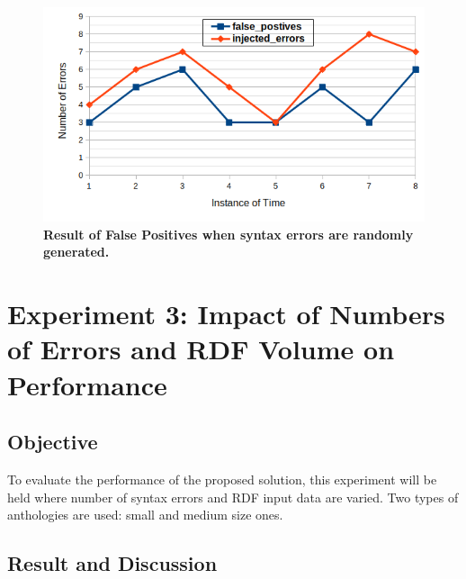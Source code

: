 	\begin{figure}[ht]
	\begin{center}
		\includegraphics[scale=0.8,angle=0]{images/Experiment02-03.png}
				\setlength\belowcaptionskip{-5mm}
		\caption{\textbf{Result of False Positives when syntax errors are randomly generated.}} 
		\label{Fig:Experiment02-03}
	\end{center}
\end{figure}

\section{Experiment 3: Impact of Numbers of Errors and RDF Volume on Performance}
\subsection{Objective}

To evaluate the performance of the proposed solution, this experiment will be held where number of syntax errors and RDF input data are varied. Two types of anthologies are used: small and medium size ones.  




\subsection{Result and Discussion}







